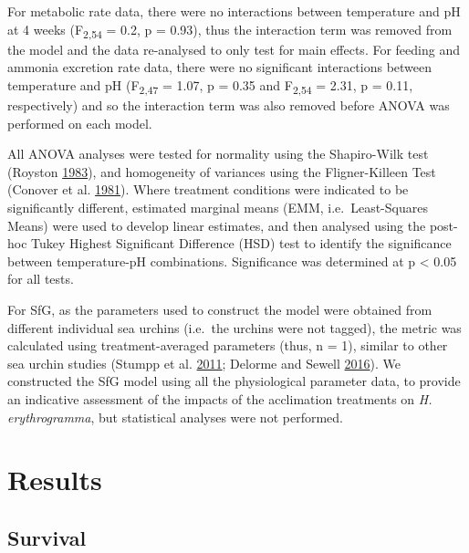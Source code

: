 \documentclass[a4paper,10pt, oneside]{memoir}
\begin{document}
For metabolic rate data, there were no interactions between temperature and pH at 4 weeks (\si{F_{2,54}} = 0.2, p = 0.93), thus the interaction term was removed from the model and the data re-analysed to only test for main effects.
For feeding and ammonia excretion rate data, there were no significant interactions between temperature and pH (\si{F_{2,47}} = 1.07, p = 0.35 and \si{F_{2,54}} = 2.31, p = 0.11, respectively) and so the interaction term was also removed before ANOVA was performed on each model.

All ANOVA analyses were tested for normality using the Shapiro-Wilk test (Royston \protect\hyperlink{ref-Royston1983}{1983}), and homogeneity of variances using the Fligner-Killeen Test (Conover et al. \protect\hyperlink{ref-Conover1981}{1981}).
Where treatment conditions were indicated to be significantly different, estimated marginal means (EMM, i.e.~Least-Squares Means) were used to develop linear estimates, and then analysed using the post-hoc Tukey Highest Significant Difference (HSD) test to identify the significance between temperature-pH combinations.
Significance was determined at p \textless{} 0.05 for all tests.

For SfG, as the parameters used to construct the model were obtained from different individual sea urchins (i.e.~the urchins were not tagged), the metric was calculated using treatment-averaged parameters (thus, n = 1), similar to other sea urchin studies (Stumpp et al. \protect\hyperlink{ref-Stumpp2011}{2011}; Delorme and Sewell \protect\hyperlink{ref-Delorme2016}{2016}).
We constructed the SfG model using all the physiological parameter data, to provide an indicative assessment of the impacts of the acclimation treatments on \textit{H. erythrogramma}, but statistical analyses were not performed.

\hypertarget{results-1}{%
\section{Results}\label{results-1}}

\hypertarget{survival-2}{%
\subsection{Survival}\label{survival-2}}
\end{document}
